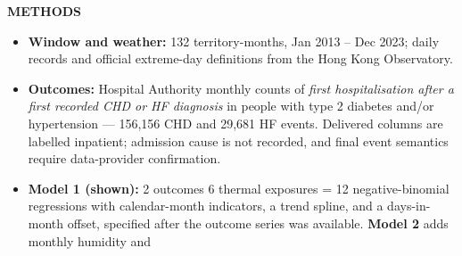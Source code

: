 \documentclass[12pt]{article}
\newcommand{\sechead}[1]{%
  {\color{Navy}\bfseries\fontsize{34}{40}\selectfont #1\par}%
  \vspace{1.4mm}{\color{Teal}\rule{\linewidth}{2.6pt}\par}\vspace{7mm}}
\newcommand{\body}{\fontsize{26}{33}\selectfont}
\begin{document}
\begin{minipage}[t]{0.58\textwidth}
\vspace{8mm}
\sechead{METHODS}
\centering
{}\par
\vspace{6mm}
\begin{flushleft}
\body
\begin{itemize}
  \item \textbf{Window and weather:} 132 territory-months, Jan 2013 -- Dec 2023;
        daily records and official extreme-day definitions from the Hong Kong
        Observatory.
  \item \textbf{Outcomes:} Hospital Authority monthly counts of \emph{first
        hospitalisation after a first recorded CHD or HF diagnosis} in people
        with type 2 diabetes and/or hypertension --- 156{,}156 CHD and 29{,}681
        HF events. Delivered columns are labelled inpatient; admission cause is
        not recorded, and final event semantics require data-provider
        confirmation.
  \item \textbf{Model 1 (shown):} 2 outcomes \texttimes{} 6 thermal exposures
        = 12 negative-binomial regressions with calendar-month indicators, a
        trend spline, and a days-in-month offset, specified after the outcome
        series was available. \textbf{Model 2} adds monthly humidity and

\end{itemize}
\end{flushleft}
\end{minipage}
\end{document}
